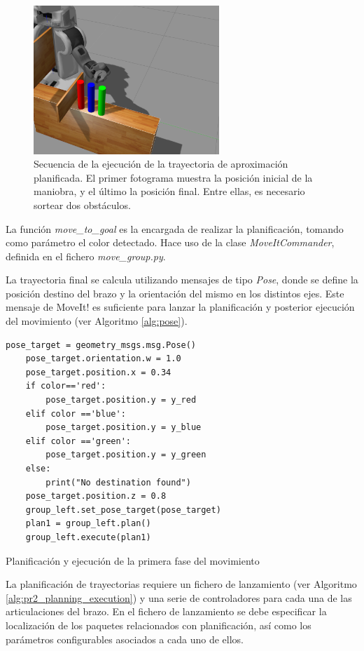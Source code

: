 \documentclass[12pt,spanish,chapterprefix, numbers=noenddot]{book}
\numberwithin{equation}{section}
\numberwithin{figure}{section}
\begin{document}
\begin{figure}[hbt!]
\includegraphics[width=7cm]{Figs/pos1_1.png}
\par
\caption{\label{fig:aprox}Secuencia de la ejecución de la trayectoria de aproximación planificada. El primer fotograma muestra la posición inicial de la maniobra, y el último la posición final. Entre ellas, es necesario sortear dos obstáculos.}
\end{figure}

La función \textit{move\_to\_goal} es la encargada de realizar la planificación, tomando como parámetro el color detectado.
Hace uso de la clase \textit{MoveItCommander}, definida en el fichero \textit{move\_group.py}.  
	
La trayectoria final se calcula utilizando mensajes de tipo \textit{Pose}, donde se define la posición destino del brazo y la orientación del mismo en los distintos ejes. Este mensaje de MoveIt! es suficiente para lanzar la planificación y posterior ejecución del movimiento (ver Algoritmo \ref{alg:pose}).

\begin{algorithm}[htb!]
    \begin{lstlisting}[frame=single] 
    pose_target = geometry_msgs.msg.Pose()
    pose_target.orientation.w = 1.0
    pose_target.position.x = 0.34 
    if color=='red':
        pose_target.position.y = y_red
    elif color =='blue':
        pose_target.position.y = y_blue
    elif color =='green':
        pose_target.position.y = y_green
    else:
        print("No destination found")
    pose_target.position.z = 0.8 
    group_left.set_pose_target(pose_target)
    plan1 = group_left.plan()
    group_left.execute(plan1)
    \end{lstlisting}
\caption{\label{alg:pose}Planificación y ejecución de la primera fase del movimiento}
\end{algorithm}
	
La planificación de trayectorias requiere un fichero de lanzamiento (ver Algoritmo \ref{alg:pr2_planning_execution}) y una serie de controladores para cada una de las articulaciones del brazo. 
En el fichero de lanzamiento se debe especificar la localización de los paquetes relacionados con planificación, así como los parámetros configurables asociados a cada uno de ellos. 
\end{document}
